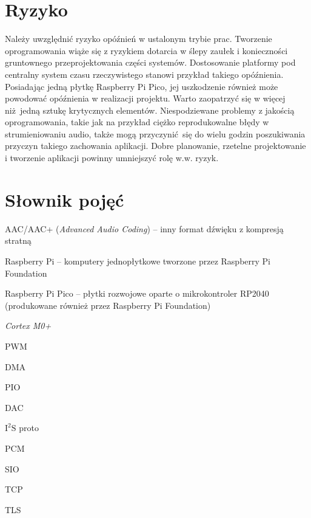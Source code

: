 \documentclass[12pt]{report}
\let\tempone\itemize
\let\temptwo\enditemize
\renewenvironment{itemize}{\tempone\setlength{\itemsep}{0cm}}{\temptwo}
\newcommand{\isqs}{$\text{I}^{2}\text{S}$}
\begin{document}
	\section{Ryzyko}
		Należy uwzględnić ryzyko opóźnień w ustalonym trybie prac. Tworzenie oprogramowania wiąże się z ryzykiem dotarcia w ślepy zaułek i konieczności gruntownego przeprojektowania części systemów. Dostosowanie platformy pod centralny system czasu rzeczywistego stanowi przykład takiego opóźnienia. Posiadając jedną płytkę Raspberry Pi Pico, jej uszkodzenie również może powodować opóźnienia w realizacji projektu. Warto zaopatrzyć się w więcej niż jedną sztukę krytycznych elementów. Niespodziewane problemy z jakością oprogramowania, takie jak na przykład ciężko reprodukowalne błędy w strumieniowaniu audio, także mogą przyczynić się do wielu godzin poszukiwania przyczyn takiego zachowania aplikacji.
		Dobre planowanie, rzetelne projektowanie i tworzenie aplikacji powinny umniejszyć rolę w.w. ryzyk.
	
	\section{Słownik pojęć}
	\begin{itemize}
		\item AAC/AAC+ (\textit{Advanced Audio Coding}) -- inny format dźwięku z kompresją stratną
		\item Raspberry Pi -- komputery jednopłytkowe tworzone przez Raspberry Pi Foundation
		\item Raspberry Pi Pico -- płytki rozwojowe oparte o mikrokontroler RP2040 (produkowane również przez Raspberry Pi Foundation)
		\item \textit{Cortex M0+}
		\item PWM
		\item DMA
		\item PIO
		\item DAC
		\item \isqs{} proto
		\item PCM
		\item SIO
		\item TCP
		\item TLS
	\end{itemize}
\end{document}
